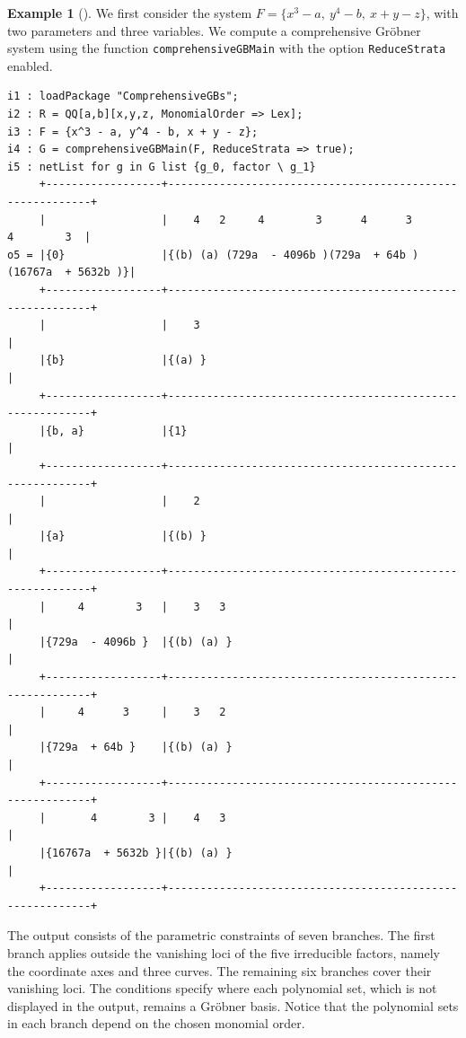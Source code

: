 \documentclass[11pt]{amsart}
\theoremstyle{plain}
\theoremstyle{definition}
\newtheorem{example}[theorem]{Example}
\theoremstyle{remark}
\begin{document}
\begin{example}[{\cite[Example~1]{SS}}]
We first consider the system $F=\{x^3-a,\ y^4-b,\ x+y-z\}$,
with two parameters and three variables.
We compute a comprehensive Gr\"obner system using
the function \texttt{comprehensiveGBMain} with the option \texttt{ReduceStrata} enabled.

\begin{lstlisting}  
i1 : loadPackage "ComprehensiveGBs";
i2 : R = QQ[a,b][x,y,z, MonomialOrder => Lex];
i3 : F = {x^3 - a, y^4 - b, x + y - z};
i4 : G = comprehensiveGBMain(F, ReduceStrata => true);
i5 : netList for g in G list {g_0, factor \ g_1}
     +------------------+----------------------------------------------------------+
     |                  |    4   2     4        3      4      3        4        3  |
o5 = |{0}               |{(b) (a) (729a  - 4096b )(729a  + 64b )(16767a  + 5632b )}|
     +------------------+----------------------------------------------------------+
     |                  |    3                                                     |
     |{b}               |{(a) }                                                    |
     +------------------+----------------------------------------------------------+
     |{b, a}            |{1}                                                       |
     +------------------+----------------------------------------------------------+
     |                  |    2                                                     |
     |{a}               |{(b) }                                                    |
     +------------------+----------------------------------------------------------+
     |     4        3   |    3   3                                                 |
     |{729a  - 4096b }  |{(b) (a) }                                                |
     +------------------+----------------------------------------------------------+
     |     4      3     |    3   2                                                 |
     |{729a  + 64b }    |{(b) (a) }                                                |
     +------------------+----------------------------------------------------------+
     |       4        3 |    4   3                                                 |
     |{16767a  + 5632b }|{(b) (a) }                                                |
     +------------------+----------------------------------------------------------+
\end{lstlisting}

The output consists of the parametric constraints of seven branches. The first branch applies outside the vanishing loci of the five irreducible factors, namely the coordinate axes and three curves. The remaining six branches cover their vanishing loci. The conditions specify where each polynomial set, which is not displayed in the output, remains a Gröbner basis. Notice that the polynomial sets in each branch depend on the chosen monomial order.
\end{example}
\end{document}
